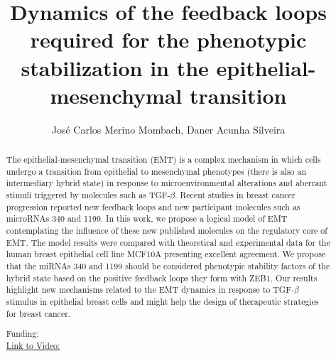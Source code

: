 \documentclass[twoside]{article}
\title{\vspace{-15mm}\fontsize{24pt}{10pt}\selectfont\textbf{ Dynamics of the feedback loops required for the phenotypic stabilization in the epithelial-mesenchymal transition }} %
\author{ Jos\'e Carlos Merino Mombach,  Daner Acunha Silveira }
\affil{ UNIVERSIDADE FEDERAL DE SANTA MARIA }
\date{}
\begin{document}
  
  
  \maketitle %
  
  
  \thispagestyle{fancy} %
  
  
  \begin{abstract}
  The epithelial-mesenchymal transition (EMT) is a complex mechanism in which cells undergo a transition from epithelial to mesenchymal phenotypes (there is also an intermediary hybrid state) in response to microenvironmental alterations and aberrant stimuli triggered by molecules such as TGF-$\beta$. Recent studies in breast cancer progression reported new feedback loops and new participant molecules such as microRNAs 340 and 1199. In this work,  we propose a logical model of EMT contemplating the influence of these new published molecules on the regulatory core of EMT. The model results were compared with theoretical and experimental data for the human breast epithelial cell line MCF10A presenting excellent agreement. We propose that the miRNAs 340 and 1199 should be considered phenotypic stability factors of the hybrid state based on the positive feedback loops they form with ZEB1. Our results highlight new mechanisms related to the EMT dynamics in response to TGF-$\beta$ stimulus in epithelial breast cells and might help the design of therapeutic strategies for breast cancer.
  
  Funding:   \\
  \href{http://ab3c.org.br/xpress_pres2020/xmxp2020-297990.html}{Link to Video:}

  \end{abstract}
   
  
\end{document}
